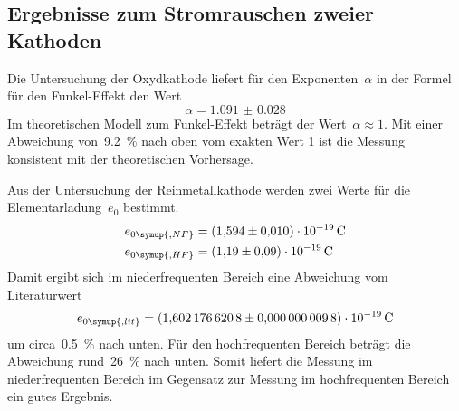 \subsection{Ergebnisse zum Stromrauschen zweier Kathoden}
%
Die Untersuchung der Oxydkathode liefert für den Exponenten~$\alpha$ in der
Formel für den Funkel-Effekt den Wert
%
\begin{equation}
  \alpha=\num{1.091(28)}
\end{equation}
%
Im theoretischen Modell zum Funkel-Effekt beträgt der Wert~$\alpha\approx 1$.
Mit einer Abweichung von~\SI{9.2}{\percent} nach oben vom exakten Wert 1 ist die
Messung konsistent mit der theoretischen Vorhersage.

Aus der Untersuchung der Reinmetallkathode werden zwei Werte für die
Elementarladung~$e_0$ bestimmt.
%
\begin{align}
  e_{0\symup{, NF}}&=\SI{1.594(10)e-19}{\coulomb} \\
  e_{0\symup{, HF}}&=\SI{1.19(9)e-19}{\coulomb}
\end{align}
%
Damit ergibt sich im niederfrequenten Bereich eine Abweichung vom
Literaturwert~\cite{CODATA}
%
\begin{equation}
  e_{0\symup{, lit}}=\SI{1.6021766208(98)e-19}{\coulomb}
\end{equation}
%
um circa~\SI{0.5}{\percent} nach unten. Für den hochfrequenten Bereich beträgt
die Abweichung rund~\SI{26}{\percent} nach unten. Somit liefert die Messung im
niederfrequenten Bereich im Gegensatz zur Messung im hochfrequenten Bereich ein
gutes Ergebnis.
%
\nocite{V57}
